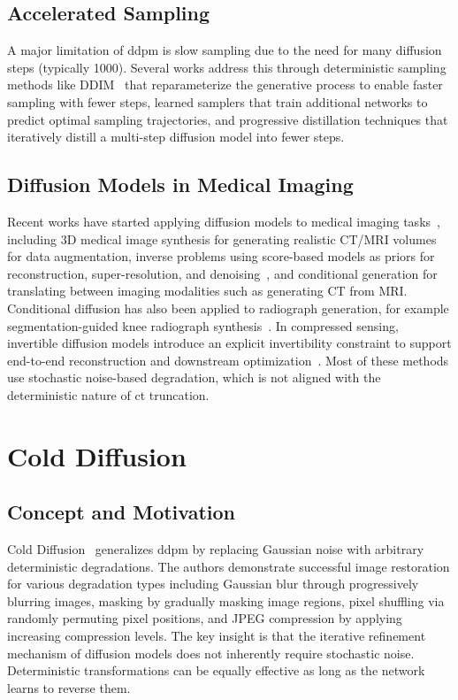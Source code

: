 \subsection{Accelerated Sampling}

A major limitation of \gls{ddpm} is slow sampling due to the need for many diffusion steps (typically 1000). Several works address this through deterministic sampling methods like DDIM~\cite{song2020denoising} that reparameterize the generative process to enable faster sampling with fewer steps, learned samplers that train additional networks to predict optimal sampling trajectories, and progressive distillation techniques that iteratively distill a multi-step diffusion model into fewer steps.

\subsection{Diffusion Models in Medical Imaging}

Recent works have started applying diffusion models to medical imaging tasks~\cite{khader2022medical, song2022solving}, including 3D medical image synthesis for generating realistic CT/MRI volumes for data augmentation, inverse problems using score-based models as priors for reconstruction, super-resolution, and denoising~\cite{song2022solving}, and conditional generation for translating between imaging modalities such as generating CT from MRI. Conditional diffusion has also been applied to radiograph generation, for example segmentation-guided knee radiograph synthesis~\cite{mei2024segmentation}. In compressed sensing, invertible diffusion models introduce an explicit invertibility constraint to support end-to-end reconstruction and downstream optimization~\cite{chen2025idm}. Most of these methods use stochastic noise-based degradation, which is not aligned with the deterministic nature of \gls{ct} truncation.

\section{Cold Diffusion}

\subsection{Concept and Motivation}

Cold Diffusion~\cite{bansal2022cold} generalizes \gls{ddpm} by replacing Gaussian noise with arbitrary deterministic degradations. The authors demonstrate successful image restoration for various degradation types including Gaussian blur through progressively blurring images, masking by gradually masking image regions, pixel shuffling via randomly permuting pixel positions, and JPEG compression by applying increasing compression levels. The key insight is that the iterative refinement mechanism of diffusion models does not inherently require stochastic noise. Deterministic transformations can be equally effective as long as the network learns to reverse them.

